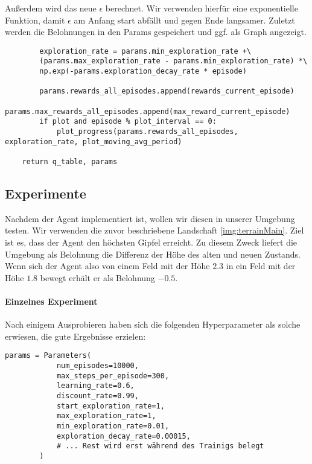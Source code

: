 Außerdem wird das neue $ \epsilon $ berechnet. Wir verwenden hierfür eine exponentielle Funktion, damit $ \epsilon $ am Anfang start abfällt und gegen Ende langsamer. Zuletzt werden die Belohnungen in den Params gespeichert und ggf. als Graph angezeigt.
\begin{verbatim}
        exploration_rate = params.min_exploration_rate +\
        (params.max_exploration_rate - params.min_exploration_rate) *\
        np.exp(-params.exploration_decay_rate * episode)

        params.rewards_all_episodes.append(rewards_current_episode)
        params.max_rewards_all_episodes.append(max_reward_current_episode)
        if plot and episode % plot_interval == 0:
            plot_progress(params.rewards_all_episodes, exploration_rate, plot_moving_avg_period)

    return q_table, params
\end{verbatim}

\smallspace

\subsection{Experimente} \label{sec:qLearningExperiments}
Nachdem der Agent implementiert ist, wollen wir diesen in unserer Umgebung testen. Wir verwenden die zuvor beschriebene Landschaft \ref{img:terrainMain}. Ziel ist es, dass der Agent den höchsten Gipfel erreicht. Zu diesem Zweck liefert die Umgebung als Belohnung die Differenz der Höhe des alten und neuen Zustands. Wenn sich der Agent also von einem Feld mit der Höhe $ 2.3 $ in ein Feld mit der Höhe $ 1.8 $ bewegt erhält er als Belohnung $ -0.5 $.

\paragraph{Einzelnes Experiment}
Nach einigem Ausprobieren haben sich die folgenden Hyperparameter als solche erwiesen, die gute Ergebnisse erzielen:
\begin{verbatim}
params = Parameters(
            num_episodes=10000,
            max_steps_per_episode=300,
            learning_rate=0.6,
            discount_rate=0.99,
            start_exploration_rate=1,
            max_exploration_rate=1,
            min_exploration_rate=0.01,
            exploration_decay_rate=0.00015,
            # ... Rest wird erst während des Trainigs belegt
        )
\end{verbatim}

